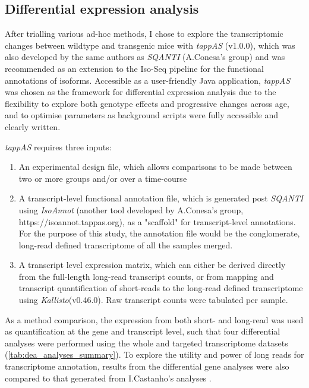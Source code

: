 \subsection{Differential expression analysis}
After trialling various ad-hoc methods, I chose to explore the transcriptomic changes between wildtype and transgenic mice with \textit{tappAS} (v1.0.0)\cite{DeLaFuente2020}, which was also developed by the same authors as \textit{SQANTI} (A.Conesa's group) and was recommended as an extension to the Iso-Seq pipeline for the functional annotations of isoforms. Accessible as a user-friendly Java application, \textit{tappAS} was chosen as the framework for differential expression analysis due to the flexibility to explore both genotype effects and progressive changes across age, and to optimise parameters as background scripts were fully accessible and clearly written.

\textit{tappAS} requires three inputs\cite{DeLaFuente2020}:
\begin{enumerate}
	\item An experimental design file, which allows comparisons to be made between two or more groups and/or over a time-course 
	\item A transcript-level functional annotation file, which is generated post \textit{SQANTI} using \textit{IsoAnnot} (another tool developed by A.Conesa's group, https://isoannot.tappas.org), as a "scaffold" for transcript-level annotations. For the purpose of this study, the annotation file would be the conglomerate, long-read defined transcriptome of all the samples merged. 
	\item A transcript level expression matrix, which can either be derived directly from the full-length long-read transcript counts, or from mapping and transcript quantification of short-reads to the long-read defined transcriptome using \textit{Kallisto}(v0.46.0). Raw transcript counts were tabulated per sample.  	 
\end{enumerate}

As a method comparison, the expression from both short- and long-read was used as quantification at the gene and transcript level, such that four differential analyses were performed using the whole and targeted transcriptome datasets (\cref{tab:dea_analyses_summary}). To explore the utility and power of long reads for transcriptome annotation, results from the differential gene analyses were also compared to that generated from I.Castanho's analyses \cite{Castanho2020}. 

